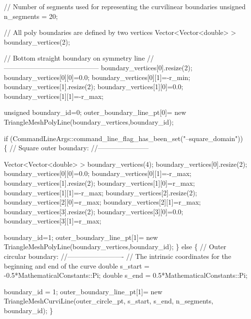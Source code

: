 \begin{DoxyCodeInclude}
 \textcolor{comment}{// Number of segments used for representing the curvilinear boundaries}
 \textcolor{keywordtype}{unsigned} n\_segments = 20;
 
 \textcolor{comment}{// All poly boundaries are defined by two vertices}
 Vector<Vector<double> > boundary\_vertices(2);
 

 \textcolor{comment}{// Bottom straight boundary on symmetry line}
 \textcolor{comment}{//------------------------------------------}
 boundary\_vertices[0].resize(2);
 boundary\_vertices[0][0]=0.0;
 boundary\_vertices[0][1]=-r\_min;
 boundary\_vertices[1].resize(2);
 boundary\_vertices[1][0]=0.0;
 boundary\_vertices[1][1]=-r\_max;

 \textcolor{keywordtype}{unsigned} boundary\_id=0;
 outer\_boundary\_line\_pt[0]=
  \textcolor{keyword}{new} TriangleMeshPolyLine(boundary\_vertices,boundary\_id);


 \textcolor{keywordflow}{if} (CommandLineArgs::command\_line\_flag\_has\_been\_set(\textcolor{stringliteral}{"--square\_domain"}))
  \{
   \textcolor{comment}{// Square outer boundary:}
   \textcolor{comment}{//-----------------------}

   Vector<Vector<double> > boundary\_vertices(4);
   boundary\_vertices[0].resize(2);
   boundary\_vertices[0][0]=0.0;
   boundary\_vertices[0][1]=-r\_max;
   boundary\_vertices[1].resize(2);
   boundary\_vertices[1][0]=r\_max;
   boundary\_vertices[1][1]=-r\_max;
   boundary\_vertices[2].resize(2);
   boundary\_vertices[2][0]=r\_max;
   boundary\_vertices[2][1]=r\_max;
   boundary\_vertices[3].resize(2);
   boundary\_vertices[3][0]=0.0;
   boundary\_vertices[3][1]=r\_max;

   boundary\_id=1;
   outer\_boundary\_line\_pt[1]=
    \textcolor{keyword}{new} TriangleMeshPolyLine(boundary\_vertices,boundary\_id);
  \}
 \textcolor{keywordflow}{else}
  \{
   \textcolor{comment}{// Outer circular boundary:}
   \textcolor{comment}{//-------------------------}
   \textcolor{comment}{// The intrinsic coordinates for the beginning and end of the curve}
   \textcolor{keywordtype}{double} s\_start = -0.5*MathematicalConstants::Pi;
   \textcolor{keywordtype}{double} s\_end   =  0.5*MathematicalConstants::Pi;
   
   boundary\_id = 1;
   outer\_boundary\_line\_pt[1]=
    \textcolor{keyword}{new} TriangleMeshCurviLine(outer\_circle\_pt,
                              s\_start,
                              s\_end,
                              n\_segments,
                              boundary\_id);
  \}



\end{DoxyCodeInclude}
